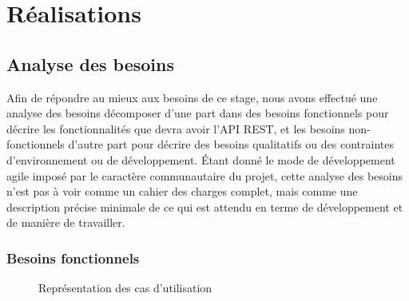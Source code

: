 \documentclass[a4paper, 11pt]{report}
\begin{document}
\chapter{Réalisations}

\section{Analyse des besoins}

Afin de répondre au mieux aux besoins de ce stage, nous avons effectué
une analyse des besoins décomposer d'une part dans des besoins
fonctionnels pour décrire les fonctionnalités que devra avoir l'API
REST, et les besoins non-fonctionnels d'autre part pour décrire des
besoins qualitatifs ou des contraintes d'environnement ou de
développement. Étant donné le mode de développement agile imposé par
le caractère communautaire du projet, cette analyse des besoins n'est
pas à voir comme un cahier des charges complet, mais comme une
description précise minimale de ce qui est attendu en terme de
développement et de manière de travailler.

\subsection{Besoins fonctionnels}

\begin{figure}
  \centering
  \caption{Représentation des cas d'utilisation}
  \label{fig:needs}
\end{figure}
\end{document}
